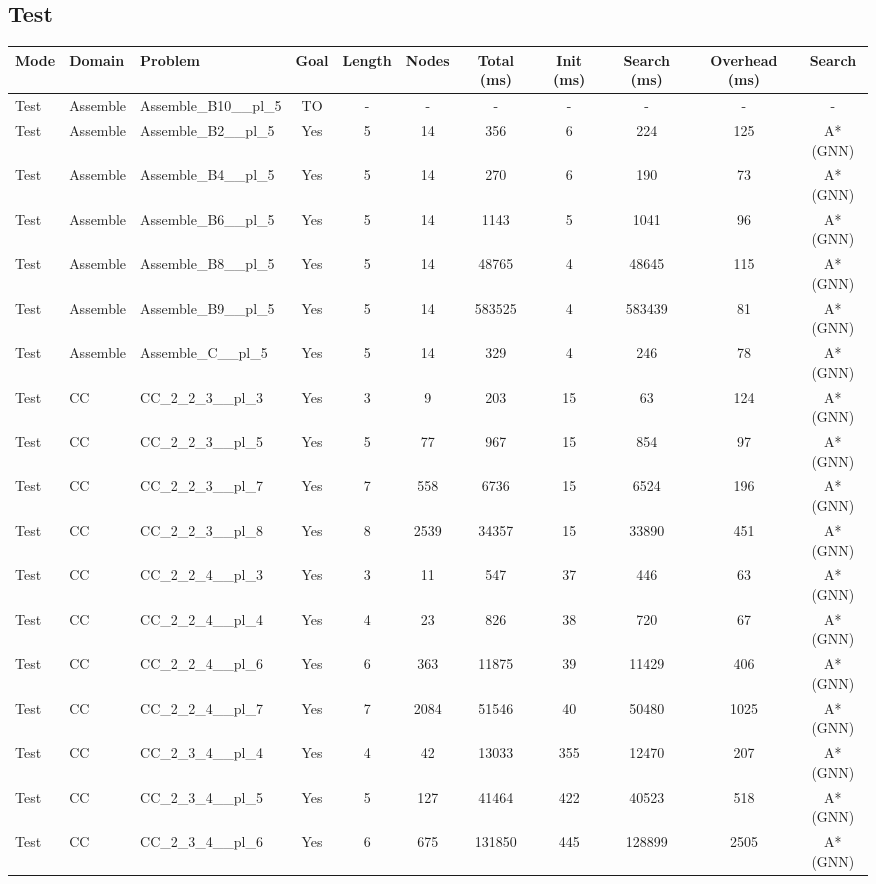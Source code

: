 \documentclass{article}
\begin{document}
\subsection*{Test}
\begin{tabular}{lllcccccccc}
\toprule
Mode & Domain & Problem & Goal & Length & Nodes & Total (ms) & Init (ms) & Search (ms) & Overhead (ms) & Search \\
\midrule
Test & Assemble & Assemble\_B10\_\_pl\_5 & TO & - & - & - & - & - & - & - \\
Test & Assemble & Assemble\_B2\_\_pl\_5 & Yes & 5 & 14 & 356 & 6 & 224 & 125 & A*(GNN) \\
Test & Assemble & Assemble\_B4\_\_pl\_5 & Yes & 5 & 14 & 270 & 6 & 190 & 73 & A*(GNN) \\
Test & Assemble & Assemble\_B6\_\_pl\_5 & Yes & 5 & 14 & 1143 & 5 & 1041 & 96 & A*(GNN) \\
Test & Assemble & Assemble\_B8\_\_pl\_5 & Yes & 5 & 14 & 48765 & 4 & 48645 & 115 & A*(GNN) \\
Test & Assemble & Assemble\_B9\_\_pl\_5 & Yes & 5 & 14 & 583525 & 4 & 583439 & 81 & A*(GNN) \\
Test & Assemble & Assemble\_C\_\_pl\_5 & Yes & 5 & 14 & 329 & 4 & 246 & 78 & A*(GNN) \\
Test & CC & CC\_2\_2\_3\_\_pl\_3 & Yes & 3 & 9 & 203 & 15 & 63 & 124 & A*(GNN) \\
Test & CC & CC\_2\_2\_3\_\_pl\_5 & Yes & 5 & 77 & 967 & 15 & 854 & 97 & A*(GNN) \\
Test & CC & CC\_2\_2\_3\_\_pl\_7 & Yes & 7 & 558 & 6736 & 15 & 6524 & 196 & A*(GNN) \\
Test & CC & CC\_2\_2\_3\_\_pl\_8 & Yes & 8 & 2539 & 34357 & 15 & 33890 & 451 & A*(GNN) \\
Test & CC & CC\_2\_2\_4\_\_pl\_3 & Yes & 3 & 11 & 547 & 37 & 446 & 63 & A*(GNN) \\
Test & CC & CC\_2\_2\_4\_\_pl\_4 & Yes & 4 & 23 & 826 & 38 & 720 & 67 & A*(GNN) \\
Test & CC & CC\_2\_2\_4\_\_pl\_6 & Yes & 6 & 363 & 11875 & 39 & 11429 & 406 & A*(GNN) \\
Test & CC & CC\_2\_2\_4\_\_pl\_7 & Yes & 7 & 2084 & 51546 & 40 & 50480 & 1025 & A*(GNN) \\
Test & CC & CC\_2\_3\_4\_\_pl\_4 & Yes & 4 & 42 & 13033 & 355 & 12470 & 207 & A*(GNN) \\
Test & CC & CC\_2\_3\_4\_\_pl\_5 & Yes & 5 & 127 & 41464 & 422 & 40523 & 518 & A*(GNN) \\
Test & CC & CC\_2\_3\_4\_\_pl\_6 & Yes & 6 & 675 & 131850 & 445 & 128899 & 2505 & A*(GNN) \\

\end{tabular}
\end{document}
